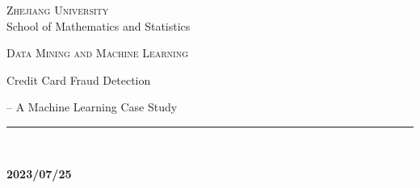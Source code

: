 
\thispagestyle{empty} %

	\noindent %
	\begin{minipage}[b]{1\textwidth}
		\centering
		{\Large {\textsc{Zhejiang University}}}\\
		\vspace{0.4 em}
		{\large {School of Mathematics and Statistics}}
		\vspace{0.6 em}
	\end{minipage}%
	
	\vspace{5 em}

	\begin{center}
		
		{\large {\textsc{Data Mining and Machine Learning}}} %
		\vspace{8 em}
		
		{\Huge {Credit Card Fraud Detection}} %
		\vspace{2 em}

		{\hfill\Large {-- A Machine Learning Case Study}\hspace{3 em}}
		\vspace{10 em}

		\vfill
		
		
		
		
		\vspace{6 em}
		
		
	    {\rule{380pt}{.4pt}}\\
		\vspace{1.2 em}
		
		\large{\textbf{2023/07/25}} %
		
		
		
		
	\end{center}

